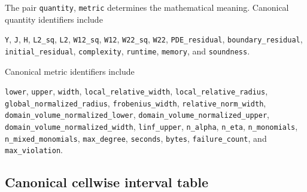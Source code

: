 \documentclass[11pt]{article}
\begin{document}
The pair \texttt{quantity}, \texttt{metric} determines the mathematical
meaning.  Canonical quantity identifiers include
\begin{center}
\texttt{Y}, \texttt{J}, \texttt{H}, \texttt{L2\_sq}, \texttt{L2},
\texttt{W12\_sq}, \texttt{W12}, \texttt{W22\_sq}, \texttt{W22},
\texttt{PDE\_residual}, \texttt{boundary\_residual},
\texttt{initial\_residual}, \texttt{complexity}, \texttt{runtime},
\texttt{memory}, and \texttt{soundness}.
\end{center}
Canonical metric identifiers include
\begin{center}
\texttt{lower}, \texttt{upper}, \texttt{width},
\texttt{local\_relative\_width}, \texttt{local\_relative\_radius},
\texttt{global\_normalized\_radius}, \texttt{frobenius\_width},
\texttt{relative\_norm\_width},
\texttt{domain\_volume\_normalized\_lower},
\texttt{domain\_volume\_normalized\_upper},
\texttt{domain\_volume\_normalized\_width},
\texttt{linf\_upper}, \texttt{n\_alpha}, \texttt{n\_eta},
\texttt{n\_monomials}, \texttt{n\_mixed\_monomials},
\texttt{max\_degree}, \texttt{seconds}, \texttt{bytes},
\texttt{failure\_count}, and \texttt{max\_violation}.
\end{center}

\subsection{Canonical cellwise interval table}
\end{document}
